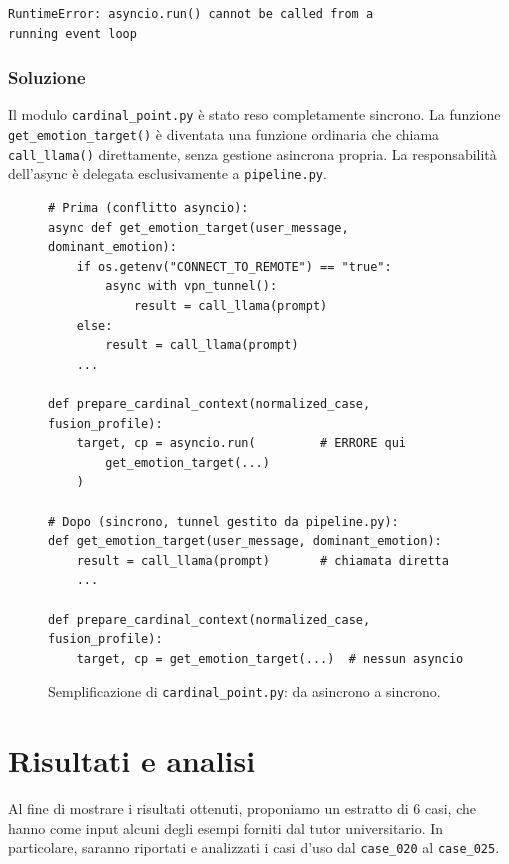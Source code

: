 \documentclass[11pt]{report}
\begin{document}
\begin{verbatim}
RuntimeError: asyncio.run() cannot be called from a 
running event loop
\end{verbatim}
 
\subsection*{Soluzione}
Il modulo \texttt{cardinal\_point.py} è stato reso completamente sincrono. La funzione \texttt{get\_emotion\_target()} è diventata una funzione ordinaria che chiama \texttt{call\_llama()} direttamente, senza gestione asincrona propria. La responsabilità dell'async è delegata esclusivamente a \texttt{pipeline.py}.
 
\begin{figure}[H]
\begin{verbatim}
# Prima (conflitto asyncio):
async def get_emotion_target(user_message, dominant_emotion):
    if os.getenv("CONNECT_TO_REMOTE") == "true":
        async with vpn_tunnel():
            result = call_llama(prompt)
    else:
        result = call_llama(prompt)
    ...
 
def prepare_cardinal_context(normalized_case, fusion_profile):
    target, cp = asyncio.run(         # ERRORE qui
        get_emotion_target(...)
    )
 
# Dopo (sincrono, tunnel gestito da pipeline.py):
def get_emotion_target(user_message, dominant_emotion):
    result = call_llama(prompt)       # chiamata diretta
    ...
 
def prepare_cardinal_context(normalized_case, fusion_profile):
    target, cp = get_emotion_target(...)  # nessun asyncio
\end{verbatim}
\caption{Semplificazione di \texttt{cardinal\_point.py}: da asincrono a sincrono.}
\end{figure}
 
\chapter{Risultati e analisi}
\label{ch:risultati}

Al fine di mostrare i risultati ottenuti, proponiamo un estratto di 6 casi, che hanno come input alcuni degli esempi forniti dal tutor universitario. In particolare, saranno riportati e analizzati i casi d'uso dal \texttt{case\_020} al \texttt{case\_025}. 
\end{document}
